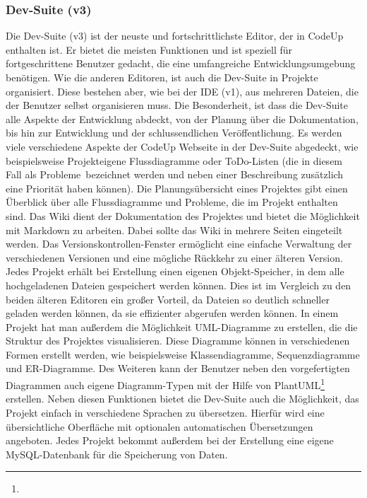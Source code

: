 \documentclass[main.tex]{subfiles}
\begin{document}
    \subsubsection{Dev-Suite (v3)}
    Die Dev-Suite (v3) ist der neuste und fortschrittlichste Editor, der in CodeUp enthalten ist.
    Er bietet die meisten Funktionen und ist speziell für fortgeschrittene Benutzer gedacht, die eine umfangreiche Entwicklungsumgebung benötigen.
    Wie die anderen Editoren, ist auch die Dev-Suite in Projekte organisiert.
    Diese bestehen aber, wie bei der IDE (v1), aus mehreren Dateien, die der Benutzer selbst organisieren muss.
    Die Besonderheit, ist dass die Dev-Suite alle Aspekte der Entwicklung abdeckt, von der Planung über die Dokumentation, bis hin zur Entwicklung und der schlussendlichen Veröffentlichung.
    Es werden viele verschiedene Aspekte der CodeUp Webseite in der Dev-Suite abgedeckt, wie beispielsweise Projekteigene Flussdiagramme oder ToDo-Listen (die in diesem Fall als \dq Probleme\dq\ bezeichnet werden und neben einer Beschreibung zusätzlich eine Priorität haben können).
    Die Planungsübersicht eines Projektes gibt einen Überblick über alle Flussdiagramme und Probleme, die im Projekt enthalten sind.
    Das Wiki dient der Dokumentation des Projektes und bietet die Möglichkeit mit Markdown zu arbeiten.
    Dabei sollte das Wiki in mehrere Seiten eingeteilt werden.
    Das Versionskontrollen-Fenster ermöglicht eine einfache Verwaltung der verschiedenen Versionen und eine mögliche Rückkehr zu einer älteren Version.
    Jedes Projekt erhält bei Erstellung einen eigenen Objekt-Speicher, in dem alle hochgeladenen Dateien gespeichert werden können.
    Dies ist im Vergleich zu den beiden älteren Editoren ein großer Vorteil, da Dateien so deutlich schneller geladen werden können, da sie effizienter abgerufen werden können.
    In einem Projekt hat man außerdem die Möglichkeit UML-Diagramme zu erstellen, die die Struktur des Projektes visualisieren.
    Diese Diagramme können in verschiedenen Formen erstellt werden, wie beispielsweise Klassendiagramme, Sequenzdiagramme und ER-Diagramme.
    Des Weiteren kann der Benutzer neben den vorgefertigten Diagrammen auch eigene Diagramm-Typen mit der Hilfe von PlantUML\footnote{} erstellen.
    Neben diesen Funktionen bietet die Dev-Suite auch die Möglichkeit, das Projekt einfach in verschiedene Sprachen zu übersetzen.
    Hierfür wird eine übersichtliche Oberfläche mit optionalen automatischen Übersetzungen angeboten.
    Jedes Projekt bekommt außerdem bei der Erstellung eine eigene MySQL-Datenbank für die Speicherung von Daten.
\end{document}
